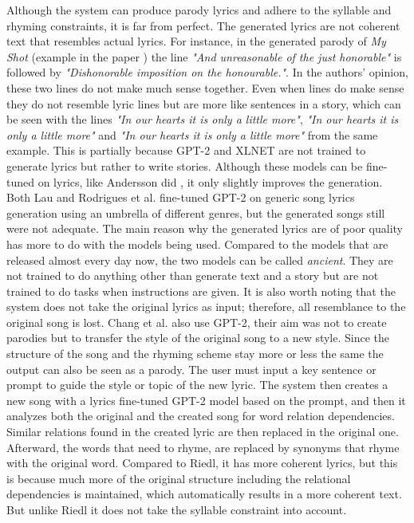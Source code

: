 Although the system can produce parody lyrics and adhere to the syllable and rhyming constraints, it is far from perfect. The generated lyrics are not coherent text that resembles actual lyrics. For instance, in the generated parody of \textit{My Shot} (example in the paper \cite{riedl_weird_2020}) the line \textit{"And unreasonable of the just honorable"} is followed by \textit{"Dishonorable imposition on the honourable."}. In the authors' opinion, these two lines do not make much sense together. Even when lines do make sense they do not resemble lyric lines but are more like sentences in a story, which can be seen with the lines \textit{"In our hearts it is only a little more"},  \textit{"In our hearts it is only a little more"} and \textit{"In our hearts it is only a little more"} from the same example. This is partially because GPT-2 and XLNET are not trained to generate lyrics but rather to write stories. Although these models can be fine-tuned on lyrics, like Andersson did \cite{andersson_ai_nodate}, it only slightly improves the generation. Both Lau \cite{lau_application_2021} and Rodrigues et al. \cite{rodrigues_lyrics_2022} fine-tuned GPT-2 on generic song lyrics generation using an umbrella of different genres, but the generated songs still were not adequate. The main reason why the generated lyrics are of poor quality has more to do with the models being used. Compared to the models that are released almost every day now, the two models can be called \textit{ancient}. They are not trained to do anything other than generate text and a story but are not trained to do tasks when instructions are given. It is also worth noting that the system does not take the original lyrics as input; therefore, all resemblance to the original song is lost.
\newline\newline
Chang et al. \cite{chang_singability-enhanced_2021} also use GPT-2, their aim was not to create parodies but to transfer the style of the original song to a new style. Since the structure of the song and the rhyming scheme stay more or less the same the output can also be seen as a parody. The user must input a key sentence or prompt to guide the style or topic of the new lyric. The system then creates a new song with a lyrics fine-tuned GPT-2 model based on the prompt, and then it analyzes both the original and the created song for word relation dependencies. Similar relations found in the created lyric are then replaced in the original one. Afterward, the words that need to rhyme, are replaced by synonyms that rhyme with the original word. Compared to Riedl, it has more coherent lyrics, but this is because much more of the original structure including the relational dependencies is maintained, which automatically results in a more coherent text. But unlike Riedl it does not take the syllable constraint into account. 
